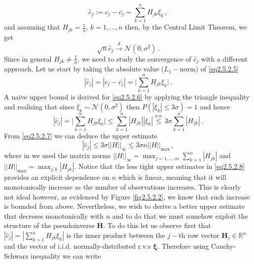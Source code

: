 \documentclass[../main.tex]{subfiles}
\begin{document}
\begin{equation}\label{eq2.5.2.5}
     \hat{c}_{j}:=c_{j} - \overline{c_{j}} = \sum_{k=1}^{n}H_{jk}\xi_{k}\,,
\end{equation}
and assuming that $H_{jk}=\frac{1}{n}$, $k=1,\dots,n$ then, by the Central Limit Theorem, we get
\begin{equation*}
        \sqrt{n}\hat{c}_{j}\xrightarrow{d}\mathcal{N}(0,\sigma^{2})\,.
\end{equation*}
Since in general $H_{jk}\neq \frac{1}{n}$, we need to study the convergence of $\hat{c}_{j}$ with a different approach.
Let us start by taking the absolute value ($L_{1}-$norm) of \eqref{eq2.5.2.5}
\begin{equation}\label{eq2.5.2.6}
        |\hat{c}_{j}| = |c_{j} - \overline{c_{j}}| = \bigg|\sum_{k=1}^{n}H_{jk}\xi_{k}\bigg|\,.
\end{equation}
A naive upper bound is derived for \eqref{eq2.5.2.6} by applying the triangle inequality and realising that since $\xi_{k}\sim \mathcal{N}(0,\sigma^{2})$ then $P(|\xi_{k}|\leq3\sigma)=1$ and hence
\begin{equation}\label{eq2.5.2.7}
        |\hat{c}_{j}| = \Bigg|\sum_{k=1}^{n}H_{jk}\xi_{k}\Bigg|\leq\sum_{k=1}^{n}|H_{jk}||\xi_{k}|\stackrel{a.a.}{\leq}3\sigma\sum_{k=1}^{n}|H_{jk}|\,.
\end{equation}
From \eqref{eq2.5.2.7} we can deduce the upper estimate
\begin{equation}\label{eq2.5.2.8}
     |\hat{c}_{j}|\leq3\sigma ||H||_{\infty} \leq3\sigma n ||H||_{\text{max}}\,,
\end{equation}
where in we used the matrix norms $||H||_{\infty} = \max_{j=1,\dots,m}\sum_{k=1}^{n}|H_{jk}|$ and $||H||_{\text{max}} = \max_{j,k}|H_{jk}| $. 
Notice that the less tight upper estimates in \eqref{eq2.5.2.8} provides an explicit dependence on $n$ which is linear, meaning that it will monotonically increase as the number of observations increases.
This is clearly not ideal however, as evidenced by Figure \ref{fig2.5.2.2}, we know that such increase is bounded from above.
Nevertheless, we wish to derive a better upper estimate that decreses monotonically with $n$ and to do that we must somehow exploit the structure of the pseudoinverse $\boldsymbol{H}$.
To do this let us observe first that $|\hat{c}_{j}| = |\sum_{k=1}^{n}H_{jk}\xi_{k}|$ is the inner product between the $j-$th row vector $\boldsymbol{H}_{j}\in \mathbb{R}^{n}$ and the vector of i.i.d. normally-distributed r.v.s $\boldsymbol{\xi}$.
Therefore using Cauchy-Schwarz inequality we can write
\end{document}

